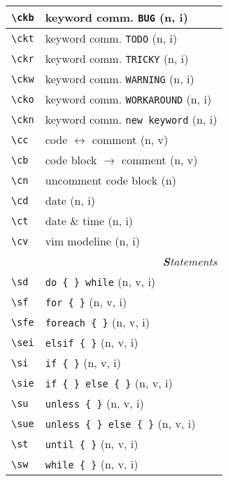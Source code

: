 \documentclass[oneside,11pt,a4paper,DIV23]{scrartcl}
\begin{document}
\begin{center}
\begin{tabular}[]{|p{12mm}|p{58mm}|}
\hline \verb'\ckb' & keyword comm. \verb'BUG'          \hfill (n, i)  \\
\hline \verb'\ckt' & keyword comm. \verb'TODO'         \hfill (n, i)  \\
\hline \verb'\ckr' & keyword comm. \verb'TRICKY'       \hfill (n, i)  \\
\hline \verb'\ckw' & keyword comm. \verb'WARNING'      \hfill (n, i)  \\
\hline \verb'\cko' & keyword comm. \verb'WORKAROUND'   \hfill (n, i)  \\
\hline \verb'\ckn' & keyword comm. \verb'new keyword'  \hfill (n, i)  \\
\hline \verb'\cc'  & code $\leftrightarrow$ comment    \hfill (n, v)  \\
\hline \verb'\cb'  & code block $\rightarrow$ comment  \hfill (n, v)  \\
\hline \verb'\cn'  & uncomment code block              \hfill (n)    \\
\hline \verb'\cd'  & date                              \hfill (n, i)  \\
\hline \verb'\ct'  & date \& time                      \hfill (n, i)  \\
\hline \verb'\cv'  & vim modeline                      \hfill (n, i)  \\
\hline
\hline
\multicolumn{2}{|r|}{\textsl{\textbf{S}tatements}} \\
\hline \verb'\sd'  & \verb'do { } while'               \hfill (n, v, i)\\
\hline \verb'\sf'  & \verb'for { }'                    \hfill (n, v, i)\\
\hline \verb'\sfe' & \verb'foreach { }'                \hfill (n, v, i)\\
\hline \verb'\sei' & \verb'elsif { }'                  \hfill (n, v, i)\\
\hline \verb'\si'  & \verb'if { }'                     \hfill (n, v, i)\\
\hline \verb'\sie' & \verb'if { } else { }'            \hfill (n, v, i)\\
\hline \verb'\su'  & \verb'unless { }'                 \hfill (n, v, i)\\
\hline \verb'\sue' & \verb'unless { } else { }'        \hfill (n, v, i)\\
\hline \verb'\st'  & \verb'until { }'                  \hfill (n, v, i)\\
\hline \verb'\sw'  & \verb'while { }'                  \hfill (n, v, i)\\

\end{tabular}
\end{center}
\end{document}
